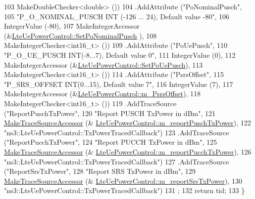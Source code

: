 \begin{DoxyCode}
103                    MakeDoubleChecker<double> ())
104     .AddAttribute (\textcolor{stringliteral}{"PoNominalPusch"},
105                    \textcolor{stringliteral}{"P\_O\_NOMINAL\_PUSCH   INT (-126 ... 24), Default value -80"},
106                    IntegerValue (-80),
107                    MakeIntegerAccessor (&\hyperlink{classns3_1_1LteUePowerControl_a011b5a698f3275b2dfd9e5c6773267ad}{LteUePowerControl::SetPoNominalPusch}
      ),
108                    MakeIntegerChecker<int16\_t> ())
109     .AddAttribute (\textcolor{stringliteral}{"PoUePusch"},
110                    \textcolor{stringliteral}{"P\_O\_UE\_PUSCH   INT(-8...7), Default value 0"},
111                    IntegerValue (0),
112                    MakeIntegerAccessor (&\hyperlink{classns3_1_1LteUePowerControl_a4c3ac336e7204466c6cd8a950da2f3a2}{LteUePowerControl::SetPoUePusch}),
113                    MakeIntegerChecker<int16\_t> ())
114     .AddAttribute (\textcolor{stringliteral}{"PsrsOffset"},
115                    \textcolor{stringliteral}{"P\_SRS\_OFFSET   INT(0...15), Default value 7"},
116                    IntegerValue (7),
117                    MakeIntegerAccessor (&\hyperlink{classns3_1_1LteUePowerControl_a8f75ff82713c4b2b79c83f9dd43b767f}{LteUePowerControl::m\_PsrsOffset}),
118                    MakeIntegerChecker<int16\_t> ())
119     .AddTraceSource (\textcolor{stringliteral}{"ReportPuschTxPower"},
120                      \textcolor{stringliteral}{"Report PUSCH TxPower in dBm"},
121                      \hyperlink{group__tracing_gab21a770b9855af4e8f69f7531ea4a6b0}{MakeTraceSourceAccessor} (&
      \hyperlink{classns3_1_1LteUePowerControl_af7702b77c409754f3edf7c887073207d}{LteUePowerControl::m\_reportPuschTxPower}),
122                      \textcolor{stringliteral}{"ns3::LteUePowerControl::TxPowerTracedCallback"})
123     .AddTraceSource (\textcolor{stringliteral}{"ReportPucchTxPower"},
124                      \textcolor{stringliteral}{"Report PUCCH TxPower in dBm"},
125                      \hyperlink{group__tracing_gab21a770b9855af4e8f69f7531ea4a6b0}{MakeTraceSourceAccessor} (&
      \hyperlink{classns3_1_1LteUePowerControl_a327b43591fbfc775bca9a4948a57489e}{LteUePowerControl::m\_reportPucchTxPower}),
126                      \textcolor{stringliteral}{"ns3::LteUePowerControl::TxPowerTracedCallback"})
127     .AddTraceSource (\textcolor{stringliteral}{"ReportSrsTxPower"},
128                      \textcolor{stringliteral}{"Report SRS TxPower in dBm"},
129                      \hyperlink{group__tracing_gab21a770b9855af4e8f69f7531ea4a6b0}{MakeTraceSourceAccessor} (&
      \hyperlink{classns3_1_1LteUePowerControl_a1eed65ba5f8536af5999b925dc73bdad}{LteUePowerControl::m\_reportSrsTxPower}),
130                      \textcolor{stringliteral}{"ns3::LteUePowerControl::TxPowerTracedCallback"})
131   ;
132   \textcolor{keywordflow}{return} tid;
133 \}
\end{DoxyCode}


